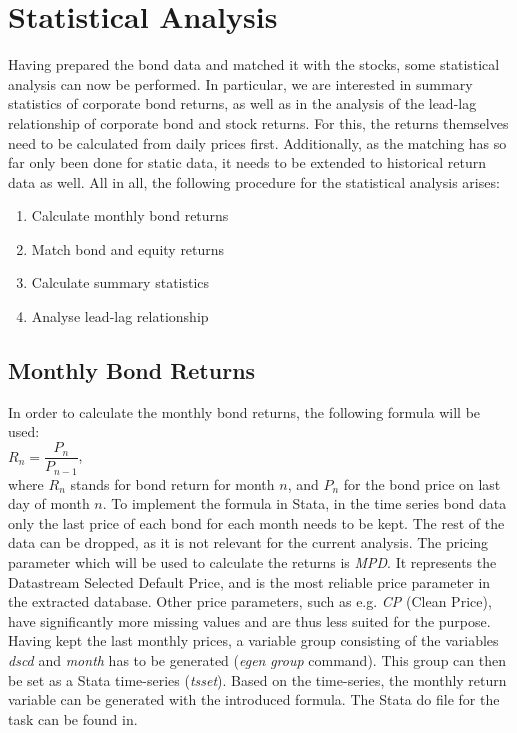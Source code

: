 \chapter{Statistical Analysis} \label{chapter:statistical-analysis}
Having prepared the bond data and matched it with the stocks, some statistical analysis can now be performed. In particular, we are interested in summary statistics of corporate bond returns, as well as in the analysis of the lead-lag relationship of corporate bond and stock returns. For this, the returns themselves need to be calculated from daily prices first. Additionally, as the matching has so far only been done for static data, it needs to be extended to historical return data as well. All in all, the following procedure for the statistical analysis arises: 
\begin{enumerate}
	\item Calculate monthly bond returns
	\item Match bond and equity returns
	\item Calculate summary statistics
	\item Analyse lead-lag relationship
\end{enumerate}

\section{Monthly Bond Returns}
In order to calculate the monthly bond returns, the following formula will be used: \\
$R_{n} = \dfrac{P_{n}}{P_{n-1}}$, \\ where $R_{n}$ stands for bond return for month $n$, and $P_{n}$ for the bond price on last day of month $n$. 
To implement the formula in Stata, in the time series bond data only the last price of each bond for each month needs to be kept. The rest of the data can be dropped, as it is not relevant for the current analysis. The pricing parameter which will be used to calculate the returns is \textit{MPD}. It represents the Datastream Selected Default Price, and is the most reliable price parameter in the extracted database. Other price parameters, such as e.g. \textit{CP} (Clean Price), have significantly more missing values and are thus less suited for the purpose. Having kept the last monthly prices, a variable group consisting of the variables \textit{dscd} and \textit{month} has to be generated (\textit{egen} \textit{group} command). This group can then be set as a Stata time-series (\textit{tsset}). Based on the time-series, the monthly return variable can be generated with the introduced formula. The Stata do file for the task can be found in. %

